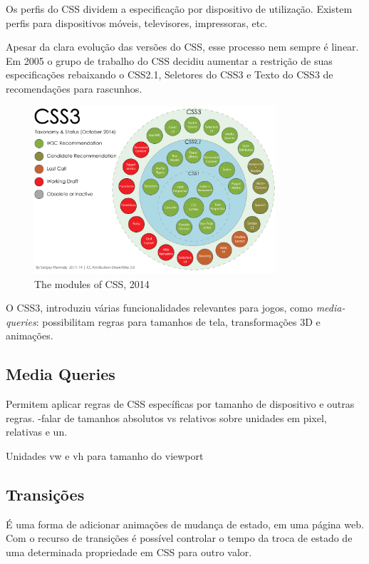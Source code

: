 \documentclass[
12pt,
a4paper,
portuges,
draft
]{report}
\begin{document}
Os perfis do CSS dividem a especificação por dispositivo de utilização. Existem perfis
para dispositivos móveis, televisores, impressoras, etc.

Apesar da clara evolução das versões do CSS, esse processo nem sempre é linear.
Em 2005 o grupo de trabalho do CSS decidiu aumentar a restrição de suas especificações
rebaixando o CSS2.1, Seletores do CSS3 e Texto do CSS3 de recomendações para rascunhos.

\begin{figure}
    \centering
    \includegraphics[width=0.8\textwidth,natwidth=610,natheight=642]{cssModules.png}
	\caption{The modules of CSS, 2014}
\end{figure}

O CSS3, introduziu várias funcionalidades
relevantes para jogos, como \textit{media-queries}: possibilitam regras para
tamanhos de tela, transformações 3D e animações.

\subsection{Media Queries}

Permitem aplicar regras de CSS específicas por tamanho de dispositivo e outras regras.
-falar de tamanhos absolutos vs relativos
sobre unidades em pixel, relativas e un.

Unidades vw e vh para tamanho do viewport

\subsection{Transições}

É uma forma de adicionar animações de mudança de estado, em uma página web.
Com o recurso de transições é possível controlar o tempo da
troca de estado de uma determinada propriedade em CSS para outro valor.
\end{document}
